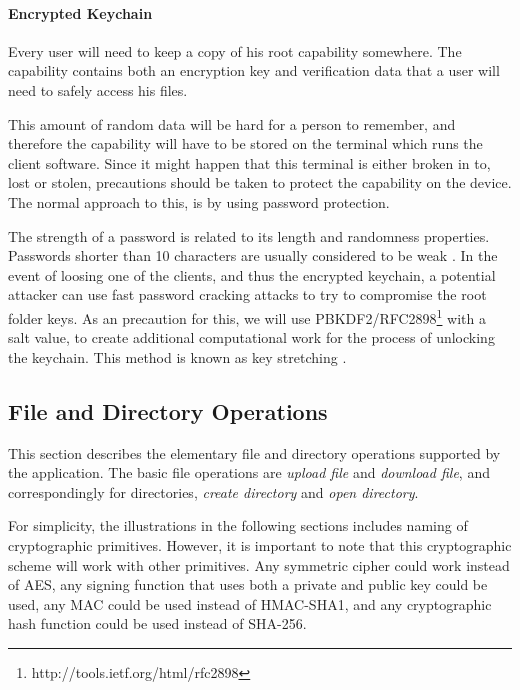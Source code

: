 \documentclass[pdftex,english,10pt,b5paper,twoside]{book}
\begin{document}


\paragraph{Encrypted Keychain} Every user will need to keep a copy of his root
capability somewhere. The capability contains both an encryption key and
verification data that a user will need to safely access his files.

This amount of random data will be hard for a person to remember, and therefore
the capability will have to be stored on the terminal which runs the client
software. Since it might happen that this terminal is either broken in to,
lost or stolen, precautions should be taken to protect the capability on the
device. The normal approach to this, is by using password protection.

The strength of a password is related to its length and randomness properties.
Passwords shorter than 10 characters are usually considered to be weak
\cite{pbkdf_nist}. In the event of loosing one of the clients, and thus the
encrypted keychain, a potential attacker can use fast password cracking attacks
to try to compromise the root folder keys. As an precaution for this, we will
use \ac{PBKDF2}/RFC2898\footnote{http://tools.ietf.org/html/rfc2898} with a
salt value, to create additional computational work for the process of
unlocking the keychain. This method is known as key stretching
\cite{keystretch}.

\subsection{File and Directory Operations}
\label{sec:CS:DO}

This section describes the elementary file and directory operations supported
by the application. The basic file operations are \emph{upload file} and
\emph{download file}, and correspondingly for directories, \emph{create
directory} and \emph{open directory}.

For simplicity, the illustrations in the following sections includes naming of
cryptographic primitives. However, it is important to note that this
cryptographic scheme will work with other primitives. Any symmetric cipher
could work instead of \ac{AES}, any signing function that uses both a private
and public key could be used, any \ac{MAC} could be used instead of
HMAC-\ac{SHA}1, and any cryptographic hash function could be used instead of
\ac{SHA}-256.
\end{document}
